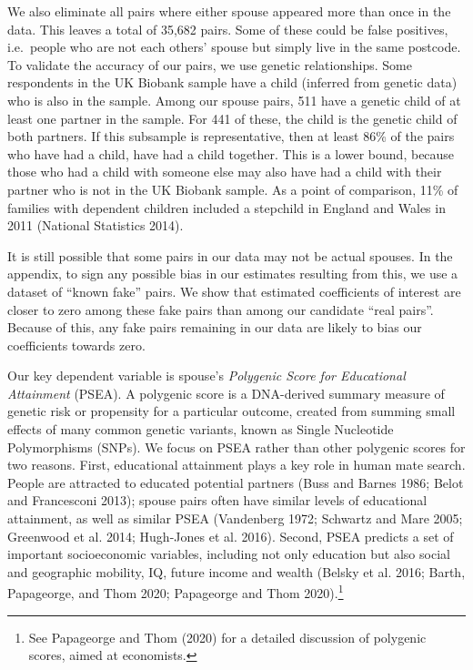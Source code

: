 \documentclass[
]{article}
\theoremstyle{definition}
\theoremstyle{definition}
\theoremstyle{definition}
\theoremstyle{definition}
\theoremstyle{remark}
\begin{document}
We also eliminate all pairs where either spouse appeared more than once
in the data. This leaves a total of 35,682 pairs. Some of
these could be false positives, i.e.~people who are not each others'
spouse but simply live in the same postcode. To validate the accuracy of
our pairs, we use genetic relationships. Some respondents in the UK
Biobank sample have a child (inferred from genetic data) who is also in the
sample. Among our spouse pairs, 511 have a genetic
child of at least one partner in the sample. For 441 of
these, the child is the genetic child of both partners. If this
subsample is representative, then at least
86\% of the pairs who have had a
child, have had a child together. This is a lower bound, because those
who had a child with someone else may also have had a child with their partner
who is not in the UK Biobank sample. As a point of comparison, 11\% of families
with dependent children included a stepchild in England and Wales in
2011 (National Statistics 2014).

It is still possible that some pairs in our data may not be actual spouses. In
the appendix, to sign any possible bias in our estimates resulting from this, we
use a dataset of ``known fake'' pairs. We show that estimated coefficients of
interest are closer to zero among these fake pairs than among our candidate
``real pairs''. Because of this, any fake pairs remaining in our data are likely
to bias our coefficients towards zero.

Our key dependent variable is spouse's \emph{Polygenic Score for Educational
Attainment} (PSEA). A polygenic score is a DNA-derived summary measure
of genetic risk or propensity for a particular outcome, created from
summing small effects of many common genetic variants, known as Single
Nucleotide Polymorphisms (SNPs). We focus on PSEA rather than other
polygenic scores for two reasons. First, educational attainment plays a key role in
human mate search. People are attracted to educated potential partners
(Buss and Barnes 1986; Belot and Francesconi 2013); spouse pairs often have
similar levels of educational attainment, as well as similar PSEA
(Vandenberg 1972; Schwartz and Mare 2005; Greenwood et al. 2014; Hugh-Jones et al. 2016). Second, PSEA predicts a set of important socioeconomic
variables, including not only education but also social and geographic mobility,
IQ, future income and wealth (Belsky et al. 2016; Barth, Papageorge, and Thom 2020; Papageorge and Thom 2020).\footnote{See Papageorge and Thom (2020) for a detailed discussion of polygenic
  scores, aimed at economists.}
\end{document}
